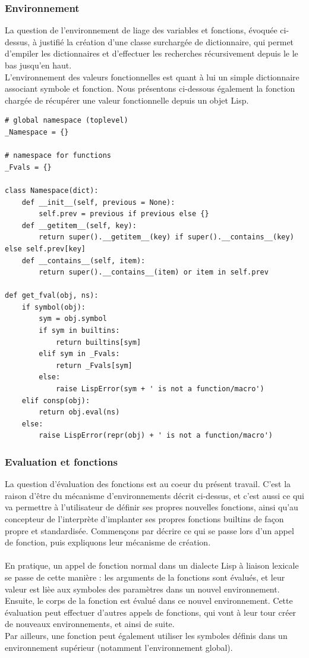\documentclass{article}
\begin{document}
\subsubsection{Environnement}
La question de l'environnement de liage des variables et fonctions, évoquée ci-dessus,
à justifié la création d'une classe surchargée de dictionnaire, qui permet d'empiler
les dictionnaires et d'effectuer les recherches récursivement depuis le le bas jusqu'en haut.
\\
L'environnement des valeurs fonctionnelles est quant à lui un simple dictionnaire associant
symbole et fonction.
Nous présentons ci-dessous également la fonction chargée de récupérer une valeur fonctionnelle
depuis un objet Lisp.
\begin{verbatim}
# global namespace (toplevel)
_Namespace = {}

# namespace for functions
_Fvals = {}

class Namespace(dict):
    def __init__(self, previous = None):
        self.prev = previous if previous else {}
    def __getitem__(self, key):
        return super().__getitem__(key) if super().__contains__(key) else self.prev[key]
    def __contains__(self, item):
        return super().__contains__(item) or item in self.prev

def get_fval(obj, ns):
    if symbol(obj):
        sym = obj.symbol
        if sym in builtins:
            return builtins[sym]
        elif sym in _Fvals:
            return _Fvals[sym]
        else:
            raise LispError(sym + ' is not a function/macro')
    elif consp(obj):
        return obj.eval(ns)
    else:
        raise LispError(repr(obj) + ' is not a function/macro')
\end{verbatim}

\subsubsection{Evaluation et fonctions}
La question d'évaluation des fonctions est au coeur du présent travail. C'est la raison d'être 
du mécanisme d'environnements décrit ci-dessus, et c'est aussi ce qui va permettre
à l'utilisateur de définir ses propres nouvelles fonctions, ainsi qu'au concepteur
de l'interprète d'implanter ses propres fonctions builtins de façon propre et standardisée.
Commençons par décrire ce qui se passe lors d'un appel de fonction, puis expliquons
leur mécanisme de création.
\paragraph{}
En pratique, un appel de fonction normal dans un dialecte Lisp à liaison lexicale se passe de cette manière :
les arguments de la fonctions sont évalués, et leur valeur est lièe aux symboles des paramètres dans un nouvel environnement.
Ensuite, le corps de la fonction est évalué dans ce nouvel environnement. Cette évaluation peut effectuer d'autres appels
de fonctions, qui vont à leur tour créer de nouveaux environnements, et ainsi de suite.
\\
Par ailleurs, une fonction peut également utiliser les symboles définis dans un environnement supérieur 
(notamment l'environnement global).
\end{document}
